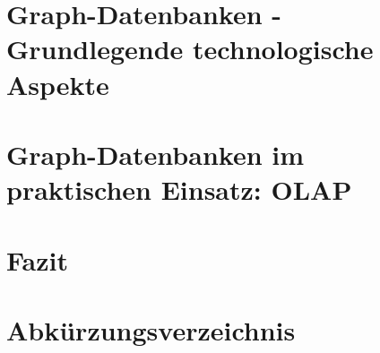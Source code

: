 \documentclass[12pt, bibliography=totoc, a4paper, abstractoff, numbers=noenddot]{scrreprt}
\begin{document}
%


\setcounter{tocdepth}{2}
\newpage


%



%
\tableofcontents \newpage

%
%

%
%

%
%
%
%
\chapter{Graph-Datenbanken - Grundlegende technologische Aspekte}






%
%
\chapter{Graph-Datenbanken im praktischen Einsatz: OLAP}




\chapter{Fazit}

 


%
\newpage
%
%
%

%
\newpage
{}
\listoffigures
\newpage
{}
\listoftables
\newpage
{}
\lstlistoflistings
%
{}
\renewcommand\refname{Abkürzungsverzeichnis}
\chapter*{Abkürzungsverzeichnis}

\newpage



%
\end{document}
